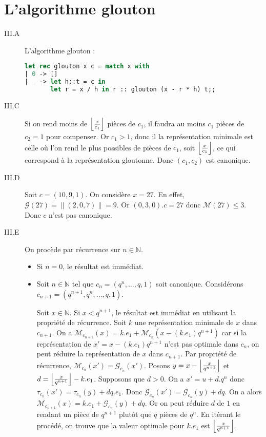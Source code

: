 \documentclass{article}
\newcommand{\N}{\mathbb{N}}
\newcommand{\M}{\mathscr{M}}
\newcommand{\T}{\tau}
\newcommand{\G}{\mathscr{G}}
\newcommand{\norm}[1]{\|#1\|}
\newcommand{\scal}{.}
\DeclarePairedDelimiter{\floor}{\lfloor}{\rfloor}
\begin{document}
\section{L'algorithme glouton}
\begin{description}
    \item[III.A] L'algorithme glouton :
        \begin{lstlisting}[language=Caml]
let rec glouton x c = match x with
| 0 -> []
| _ -> let h::t = c in
       let r = x / h in r :: glouton (x - r * h) t;;
        \end{lstlisting}

    \item[III.C] Si on rend moins de $\floor*{\frac{x}{c_1}}$ pièces de $c_1$, il faudra au moins $c_1$ pièces de $c_2 = 1$ pour compenser. Or $c_1 > 1$, donc il la représentation minimale est celle où l'on rend le plus possibles de pièces de $c_1$, soit $\floor*{\frac{x}{c_1}}$, ce qui correspond à la représentation gloutonne. Donc $(c_1, c_2)$ est canonique.

    \item[III.D] Soit $c = (10, 9, 1)$. On considère $x = 27$. En effet, $\G(27) = \norm{(2, 0, 7)} = 9$. Or $(0, 3, 0)\scal c = 27$ donc $\M(27) \leq 3$. Donc $c$ n'est pas canonique.

    \item[III.E] On procède par récurrence sur $n\in\N$.
        \begin{itemize}
            \item Si $n=0$, le résultat est immédiat.
            \item Soit $n\in\N$ tel que $c_n = (q^n, \ldots, q, 1)$ soit canonique. Considérons $c_{n+1} = (q^{n+1}, q^n, \ldots, q, 1)$.

                Soit $x\in\N$. Si $x<q^{n+1}$, le résultat est immédiat en utilisant la propriété de récurrence. Soit $k$ une représentation minimale de $x$ dans $c_{n+1}$. On a $\M_{c_{n+1}}(x) = k\scal e_1 + \M_{c_n}(x - (k\scal e_1)q^{n+1})$ car si la représentation de $x' = x - (k\scal e_1)q^{n+1}$ n'est pas optimale dans $c_n$, on peut réduire la représentation de $x$ dans $c_{n+1}$. Par propriété de récurrence, $\M_{c_n}(x') = \G_{c_n}(x')$. Posons $y = x - \floor*{\frac{x}{q^{n+1}}}$ et $d =\floor*{\frac{x}{q^{n+1}}} - k\scal e_1$. Supposons que $d > 0$. On a $x' = u + d.q^n$ donc $\T_{c_n}(x') = \T_{c_n}(y) + dq.e_1$. Donc $\G_{c_n}(x') = \G_{c_n}(y) + dq$. On a alors $\M_{c_{n+1}}(x) = k\scal e_1 + \G_{c_n}(y) + dq$. Or on peut réduire $d$ de $1$ en rendant un pièce de $q^{n+1}$ plutôt que $q$ pièces de $q^n$. En itérant le procédé, on trouve que la valeur optimale pour $k\scal e_1$ est $\floor*{\frac{x}{q^{n+1}}}$.
        \end{itemize}


\end{description}
\end{document}

